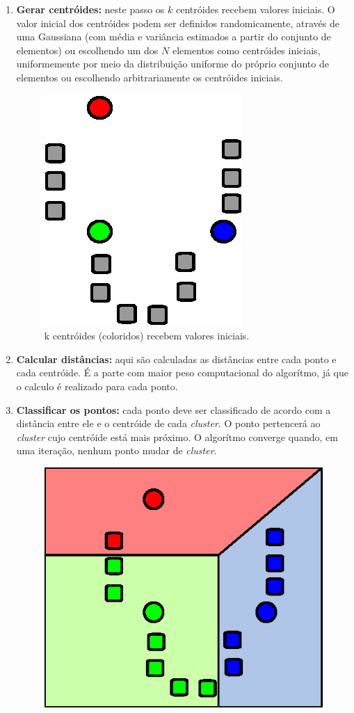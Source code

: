 \begin{enumerate}
  \item \textbf{Gerar centróides:} neste passo os \(k\) centróides recebem valores iniciais. O valor inicial dos centróides podem ser definidos randomicamente, através de uma Gaussiana (com média e variância estimados a partir do conjunto de elementos) ou escolhendo um dos \(N\) elementos como centróides iniciais, uniformemente por meio da distribuição uniforme do próprio conjunto de elementos ou escolhendo arbitrariamente os centróides iniciais.
  \begin{figure}[h]
    \centering
    \includegraphics[scale=0.6]{figuras/kmeans-1.eps}
    \caption{k centróides (coloridos) recebem valores iniciais.}
  \end{figure}
  \item \textbf{Calcular distâncias:} aqui são calculadas as distâncias entre cada ponto e cada centróide. É a parte com maior peso computacional do algorítmo, já que o calculo é realizado para cada ponto.
  \item \textbf{Classificar os pontos:} cada ponto deve ser classificado de acordo com a distância entre ele e o centróide de cada \textit{cluster}. O ponto pertencerá ao \textit{cluster} cujo centróide está mais próximo. O algorítmo converge quando, em uma iteração, nenhum ponto mudar de \textit{cluster}.
  \begin{figure}[h]
    \centering
    \includegraphics[scale=0.6]{figuras/kmeans-2.eps}

\end{figure}
\end{enumerate}
